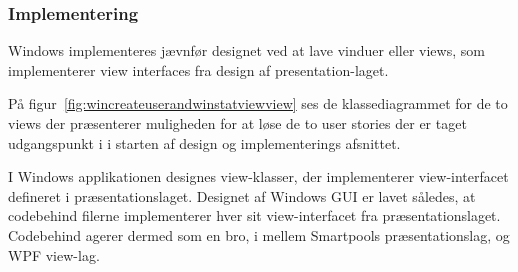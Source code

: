 \subsubsection{Implementering}
Windows implementeres jævnfør designet ved at lave vinduer eller views, som implementerer view interfaces fra design af presentation-laget.

På figur~\ref{fig:wincreateuserandwinstatviewview} ses de klassediagrammet for de to views der præsenterer muligheden for at løse de to user stories der er taget udgangspunkt i i starten af design og implementerings afsnittet.

I Windows applikationen designes view-klasser, der implementerer view-interfacet defineret i præsentationslaget.
Designet af Windows GUI er lavet således, at codebehind filerne implementerer hver sit view-interfacet fra præsentationslaget. Codebehind agerer dermed som en bro, i mellem Smartpools præsentationslag, og WPF view-lag.
